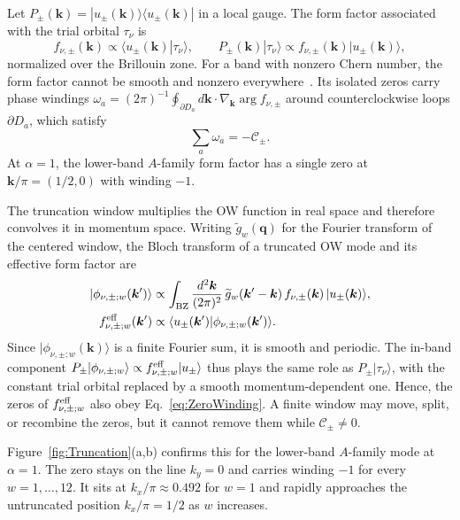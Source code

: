 \documentclass[aps,prb,10pt,twocolumn,superscriptaddress,longbibliography,floatfix]{revtex4-2}
\newcommand{\mc}[1]{\mathcal{#1}}
\newcommand{\mr}[1]{\mathrm{#1}}
\newcommand{\bs}[1]{\boldsymbol{#1}}
\newcommand{\bk}{\boldsymbol k}
\begin{document}
Let $P_\pm(\bk)=|u_\pm(\bk)\rangle\langle u_\pm(\bk)|$ in a local gauge. The form factor associated with the trial orbital $\tau_\nu$ is
\begin{equation}
    f_{\nu,\pm}(\bk)\propto\langle u_\pm(\bk)|\tau_\nu\rangle,
    \qquad
    P_\pm(\bk)|\tau_\nu\rangle\propto f_{\nu,\pm}(\bk)|u_\pm(\bk)\rangle,
    \label{eq:FormFactor}
\end{equation}
normalized over the Brillouin zone. For a band with nonzero Chern number, the form factor cannot be smooth and nonzero everywhere~\cite{BhuiyanPanJian2026}. Its isolated zeros carry phase windings $\omega_a=(2\pi)^{-1}\oint_{\partial D_a}d\bk\cdot\nabla_{\bk}\arg f_{\nu,\pm}$ around counterclockwise loops $\partial D_a$, which satisfy
\begin{equation}
    \sum_a\omega_a=-\mc C_\pm.
    \label{eq:ZeroWinding}
\end{equation}
At $\alpha=1$, the lower-band $A$-family form factor has a single zero at $\bk/\pi=(1/2,0)$ with winding $-1$.

The truncation window multiplies the OW function in real space and therefore convolves it in momentum space. Writing $\widetilde g_w(\bs q)$ for the Fourier transform of the centered window, the Bloch transform of a truncated OW mode and its effective form factor are
\begin{align}
    |\phi_{\nu,\pm;w}(\bk')\rangle&\propto\int_{\mr{BZ}}\frac{d^2\bk}{(2\pi)^2}\,\widetilde g_w(\bk'-\bk)\,f_{\nu,\pm}(\bk)\,|u_\pm(\bk)\rangle,\nonumber\\
    f^{\rm eff}_{\nu,\pm;w}(\bk')&\propto\langle u_\pm(\bk')|\phi_{\nu,\pm;w}(\bk')\rangle.
    \label{eq:EffectiveFormFactor}
\end{align}
Since $|\phi_{\nu,\pm;w}(\bk)\rangle$ is a finite Fourier sum, it is smooth and periodic. The in-band component $P_\pm|\phi_{\nu,\pm;w}\rangle\propto f^{\rm eff}_{\nu,\pm;w}|u_\pm\rangle$ thus plays the same role as $P_\pm|\tau_\nu\rangle$, with the constant trial orbital replaced by a smooth momentum-dependent one. Hence, the zeros of $f^{\rm eff}_{\nu,\pm;w}$ also obey Eq.~\eqref{eq:ZeroWinding}. A finite window may move, split, or recombine the zeros, but it cannot remove them while $\mc C_\pm\neq0$.

Figure~\ref{fig:Truncation}(a,b) confirms this for the lower-band $A$-family mode at $\alpha=1$. The zero stays on the line $k_y=0$ and carries winding $-1$ for every $w=1,\ldots,12$. It sits at $k_x/\pi\approx0.492$ for $w=1$ and rapidly approaches the untruncated position $k_x/\pi=1/2$ as $w$ increases.
\end{document}
